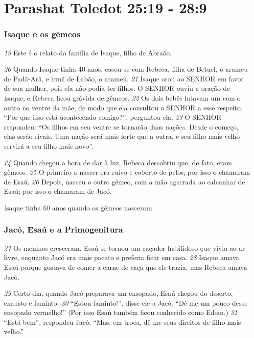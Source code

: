 \section*{Parashat Toledot 25:19 - 28:9}

\subsubsection*{Isaque e os gêmeos}

\textit{\tiny 19}
Este é o relato da família de Isaque, filho de Abraão. 

\bigskip
\textit{\tiny 20}
Quando Isaque tinha 40 anos, casou-se com Rebeca, filha de Betuel, o arameu de Padã-Arã, e irmã de
Labão, o arameu.
\textit{\tiny 21}
Isaque orou ao SENHOR em favor de sua mulher, pois ela não podia ter filhos.
O SENHOR ouviu a oração de Isaque, e Rebeca ficou grávida de gêmeos. 
\textit{\tiny 22}
Os dois
bebês lutavam um com o outro no ventre da mãe, de modo que ela consultou o
SENHOR a esse respeito. “Por que isso está acontecendo comigo?”, perguntou ela.
\textit{\tiny 23}
O SENHOR respondeu: “Os filhos em seu ventre se tornarão duas nações.
Desde o começo, elas serão rivais. Uma nação será mais forte que a outra, e seu
filho mais velho servirá a seu filho mais novo”.
   
\bigskip
\textit{\tiny 24}
Quando chegou a hora de dar à luz, Rebeca descobriu que, de fato, eram
gêmeos. 
\textit{\tiny 25}
O primeiro a nascer era ruivo e coberto de pelos; por isso o chamaram
de Esaú. 
\textit{\tiny 26}
Depois, nasceu o outro gêmeo, com a mão agarrada ao calcanhar de
Esaú; por isso o chamaram de Jacó. 

\bigskip
Isaque tinha 60 anos quando os gêmeos
nasceram.



\subsubsection*{Jacó, Esaú e a Primogenitura}

\textit{\tiny 27}
Os meninos cresceram. Esaú se tornou um caçador habilidoso que vivia ao ar
livre, enquanto Jacó era mais pacato e preferia ficar em casa. 
\textit{\tiny 28}
Isaque amava Esaú
porque gostava de comer a carne de caça que ele trazia, mas Rebeca amava Jacó.

\bigskip   
\textit{\tiny 29}
Certo dia, quando Jacó preparava um ensopado, Esaú chegou do deserto,
exausto e faminto. 
\textit{\tiny 30}
“Estou faminto!”, disse ele a Jacó. “Dê-me um pouco desse
ensopado vermelho!” (Por isso Esaú também ficou conhecido como Edom.)
\textit{\tiny 31}
“Está bem”, respondeu Jacó. “Mas, em troca, dê-me seus direitos de filho mais
velho.”
   
